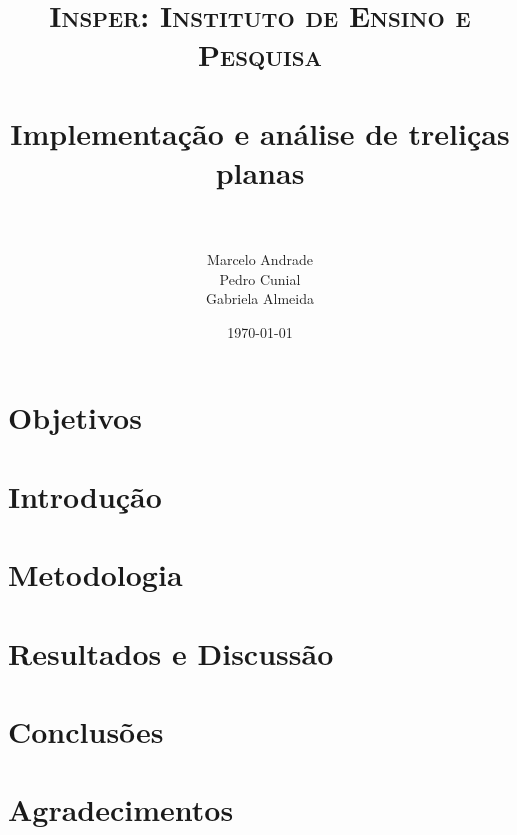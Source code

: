 \documentclass[paper=a4, fontsize=11pt]{scrartcl}
\title{
		\usefont{OT1}{bch}{b}{n}
		\normalfont \normalsize \textsc{Insper: Instituto de Ensino e Pesquisa} \\ [25pt] %
		\horrule{0.5pt} \\[0.4cm]														  
		\huge Implementação e análise de treliças planas \\			%
		\horrule{2pt} \\[0.5cm]
}
\author{										%
		\normalfont 								\normalsize
        Marcelo Andrade\\[-3pt]		\normalsize
		Pedro Cunial\\[-3pt]		\normalsize
        Gabriela Almeida\\[-3pt]		\normalsize
}
\date{\today}
\begin{document}
	
\maketitle

\newpage

\tableofcontents

\newpage


\section{Objetivos}


\section{Introdução}

\section{Metodologia}

\section{Resultados e Discussão}

\section{Conclusões}

\section{Agradecimentos}

{}


\end{document}
